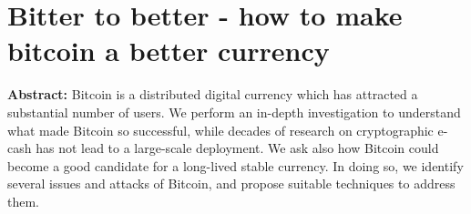 \section{Bitter to better - how to make bitcoin a better currency}

\textbf{Abstract:} 
Bitcoin is a distributed digital currency which has attracted a substantial number of users. We perform an in-depth investigation to understand what made Bitcoin so successful, while decades of research on cryptographic e-cash has not lead to a large-scale deployment. We ask also how Bitcoin could become a good candidate for a long-lived stable currency. In doing so, we identify several issues and attacks of Bitcoin, and propose suitable techniques to address them.
